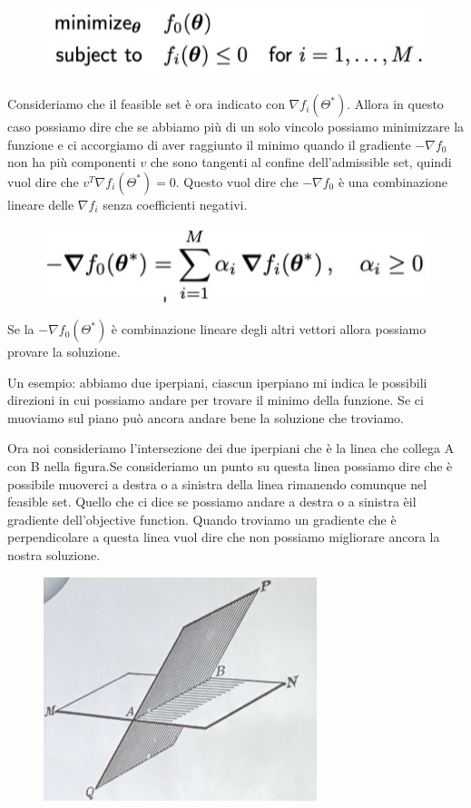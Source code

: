 \documentclass[14pt]{extreport}
\begin{document}
\begin{figure}[H]
\centering
\includegraphics[width=0.5\linewidth]{295.jpeg}
\end{figure}

Consideriamo che il feasible set è ora indicato con $\nabla f_i(\Theta^*)$. Allora in questo caso possiamo dire che se abbiamo più di un solo vincolo
possiamo minimizzare la funzione e ci accorgiamo di aver raggiunto il minimo quando il gradiente $-\nabla f_0$ non ha più componenti $v$ che sono
tangenti al confine dell'admissible set, quindi vuol dire che $v^T\nabla f_i(\Theta^*) = 0$. Questo vuol dire che $-\nabla f_0$ è una combinazione
lineare delle $\nabla f_i$ senza coefficienti negativi.

\begin{figure}[H]
\centering
\includegraphics[width=0.6\linewidth]{296.jpeg}
\end{figure}

Se la $-\nabla f_0(\Theta^*)$ è combinazione lineare degli altri vettori allora possiamo provare la soluzione.

Un esempio: abbiamo due iperpiani, ciascun iperpiano mi indica le possibili direzioni in cui possiamo andare per trovare il minimo della funzione. Se
ci muoviamo sul piano può ancora andare bene la soluzione che troviamo.

Ora noi consideriamo l'intersezione dei due iperpiani che è la linea che collega A con B nella figura.Se consideriamo un punto su questa linea
possiamo dire che è possibile muoverci a destra o a sinistra della linea rimanendo comunque nel feasible set. Quello che ci dice se possiamo andare a
destra o a sinistra èil gradiente dell'objective function. Quando troviamo un gradiente che è perpendicolare a questa linea vuol dire che non possiamo
migliorare ancora la nostra soluzione.
\begin{figure}[H]
\centering
\includegraphics[width=0.6\linewidth]{298.jpeg}
\end{figure}
\end{document}
